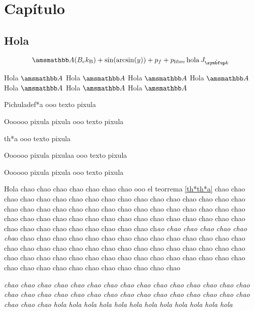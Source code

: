 




\chapter{Capítulo}

\thispagestyle{fancy}

\section{Hola}

\[
\A\parn*{B_e\kB}+\sin(\arcsin(y))+p_f+p_\text{libre}\,\mathrm{hola}\,J_{\un{k}}
\]

\textcolor{pastelpink}{Hola \(\A\)}
\textcolor{pastelred}{Hola \(\A\)}
\textcolor{pastelorange}{Hola \(\A\)}
\textcolor{pastelyellow}{Hola \(\A\)}
\textcolor{pastelgreen}{Hola \(\A\)}
\textcolor{pastelcyan}{Hola \(\A\)}
\textcolor{pastelblue}{Hola \(\A\)}

\begin{definition}{Pichula}{def*a}
ooo texto pixula
\end{definition}

\begin{definition*}{Oooooo pixula pixula}%
ooo texto pixula
\end{definition*}

\begin{theorem}{}{th*a}
ooo texto pixula
\end{theorem}

\begin{theorem}{Oooooo pixula pixula}{a}
ooo texto pixula
\end{theorem}

\begin{theorem*}{Oooooo pixula pixula}%
ooo texto pixula
\end{theorem*}

\begin{block}{Hola}
chao chao chao chao chao chao chao ooo el teorrema \ref{th*th*a} chao chao chao chao chao chao chao chao chao chao chao chao chao chao chao chao chao chao chao chao chao chao chao chao chao chao chao chao chao chao chao chao  chao chao chao chao chao chao chao chao chao chao chao chao chao chao chao chao chao chao chao chao chao chao chao chao ch\emph{ao chao chao chao chao chao cha}o chao chao chao chao chao chao chao chao chao chao chao chao chao chao chao chao chao chao chao chao chao chao chao chao chao chao chao chao chao chao chao chao chao chao chao chao chao chao chao chao chao chao chao chao chao chao chao chao chao chao chao chao chao chao chao

\textit{chao chao chao chao chao chao chao chao chao \emph{chao chao chao chao chao chao chao chao chao chao chao chao chao chao chao chao chao chao chao chao chao chao chao} chao
hola hola hola hola hola hola hola hola hola hola hola hola}
\end{block}

